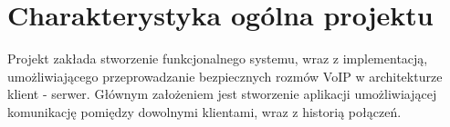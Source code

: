 \section{Charakterystyka ogólna projektu}

Projekt zakłada stworzenie funkcjonalnego systemu, wraz z implementacją, umożliwiającego przeprowadzanie bezpiecznych
rozmów VoIP w architekturze klient - serwer.
Głównym założeniem jest stworzenie aplikacji umożliwiającej komunikację pomiędzy dowolnymi klientami, wraz z
historią połączeń.